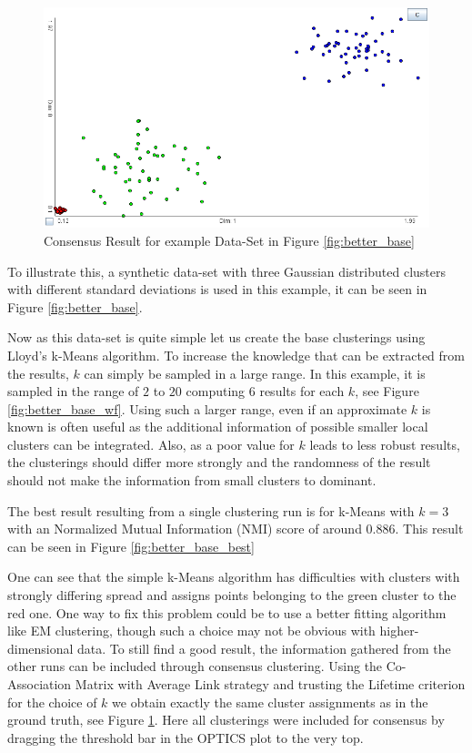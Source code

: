 \documentclass[
	a4paper,
	english,
	twoside,
	openright,               
	11pt                            
	]{report}
\begin{document}
\begin{figure}[h]
	\centering
	\includegraphics[scale=.4]{better_base_consensus}
	\caption{Consensus Result for example Data-Set in Figure \ref{fig:better_base}}
	\label{fig:better_base_consensus}
\end{figure}

To illustrate this, a synthetic data-set with three Gaussian distributed clusters with different standard deviations is used in this example, it can be seen in Figure \ref{fig:better_base}.

Now as this data-set is quite simple let us create the base clusterings using Lloyd's k-Means algorithm. To increase the knowledge that can be extracted from the results, $k$ can simply be sampled in a large range. In this example, it is sampled in the range of $2$ to $20$ computing $6$ results for each $k$, see Figure \ref{fig:better_base_wf}. Using such a larger range, even if an approximate $k$ is known is often useful as the additional information of possible smaller local clusters can be integrated. Also, as a poor value for $k$ leads to less robust results, the clusterings should differ more strongly and the randomness of the result should not make the information from small clusters to dominant.

The best result resulting from a single clustering run is for k-Means with $k=3$ with an Normalized Mutual Information (NMI) score of around $0.886$. This result can be seen in Figure \ref{fig:better_base_best} 

One can see that the simple k-Means algorithm has difficulties with clusters with strongly differing spread and assigns points belonging to the green cluster to the red one. One way to fix this problem could be to use a better fitting algorithm like EM clustering, though such a choice may not be obvious with higher-dimensional data. To still find a good result, the information gathered from the other runs can be included through consensus clustering. Using the Co-Association Matrix with Average Link strategy and trusting the Lifetime criterion for the choice of $k$ we obtain exactly the same cluster assignments as in the ground truth, see Figure \ref{fig:better_base_consensus}. Here all clusterings were included for consensus by dragging the threshold bar in the OPTICS plot to the very top.
\end{document}
